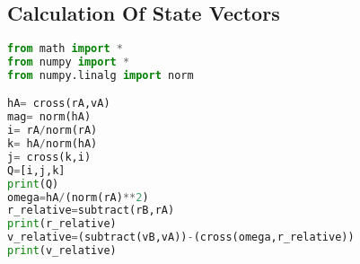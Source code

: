 \subsection{Calculation Of State Vectors}
\begin{lstlisting}[language=python, caption=CoSV.py]
from math import *
from numpy import *
from numpy.linalg import norm

hA= cross(rA,vA)
mag= norm(hA)
i= rA/norm(rA)
k= hA/norm(hA)
j= cross(k,i)
Q=[i,j,k]
print(Q)
omega=hA/(norm(rA)**2)
r_relative=subtract(rB,rA)
print(r_relative)
v_relative=(subtract(vB,vA))-(cross(omega,r_relative))
print(v_relative)
\end{lstlisting}
